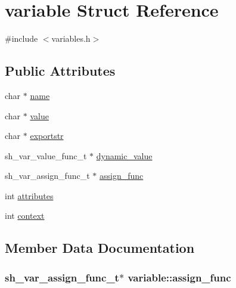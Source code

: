 \hypertarget{structvariable}{}\section{variable Struct Reference}
\label{structvariable}


{\ttfamily \#include $<$variables.\+h$>$}

\subsection*{Public Attributes}
\begin{DoxyCompactItemize}
\item 
char $\ast$ \hyperlink{structvariable_a1cd70c44962eefd96c2f97444f004946}{name}
\item 
char $\ast$ \hyperlink{structvariable_a1f8e26d6efb860cfa550220991627bd8}{value}
\item 
char $\ast$ \hyperlink{structvariable_a82a15a94556a4eb824687c5d3fb81eb2}{exportstr}
\item 
sh\+\_\+var\+\_\+value\+\_\+func\+\_\+t $\ast$ \hyperlink{structvariable_a93d9b7d062815920f1de93aee1d154ad}{dynamic\+\_\+value}
\item 
sh\+\_\+var\+\_\+assign\+\_\+func\+\_\+t $\ast$ \hyperlink{structvariable_ab0fef2f63969a5892eda920d9fd16611}{assign\+\_\+func}
\item 
int \hyperlink{structvariable_a32a92c8a80f38048bb2ef8ac0ca2287b}{attributes}
\item 
int \hyperlink{structvariable_a422d2931ad11d1875b0238974ad8f9dd}{context}
\end{DoxyCompactItemize}


\subsection{Member Data Documentation}
\subsubsection[{\texorpdfstring{assign\+\_\+func}{assign_func}}]{\setlength{\rightskip}{0pt plus 5cm}sh\+\_\+var\+\_\+assign\+\_\+func\+\_\+t$\ast$ variable\+::assign\+\_\+func}\hypertarget{structvariable_ab0fef2f63969a5892eda920d9fd16611}{}\label{structvariable_ab0fef2f63969a5892eda920d9fd16611}
